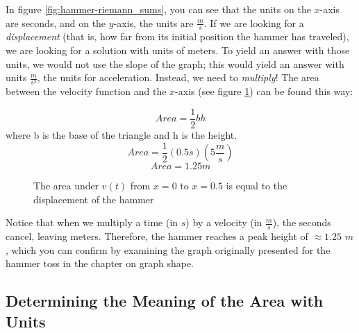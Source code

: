 In figure \ref{fig:hammer-riemann_sums}, you can see that the units on the $x$-axis are seconds, and on the $y$-axis, the units are $\frac{m}{s}$. If we are looking for a \textit{displacement} (that is, how far from its initial position the hammer has traveled), we are looking for a solution with units of meters. To yield an answer with those units, we would not use the slope of the graph; this would yield an answer with units $\frac{m}{s^2}$, the units for acceleration. Instead, we need to \textit{multiply}! The area between the velocity function and the $x$-axis (see figure \ref{fig:hammerarea}) can be found this way:

$$Area=\frac{1}{2}bh$$where b is the base of the triangle and h is the height.
$$Area=\frac{1}{2}(0.5s)(5\frac{m}{s})$$
$$Area=1.25m$$


\begin{figure}[H]
	\centering
	\caption{The area under $v(t)$ from $x=0$ to $x=0.5$ is equal to the displacement of the hammer}
	\label{fig:hammerarea}
\end{figure}

Notice that when we multiply a time (in $s$) by a velocity (in $\frac{m}{s}$), the seconds cancel, leaving meters. Therefore, the hammer reaches a peak height of $\approx1.25$ $m$, which you can confirm by examining the graph originally presented for the hammer toss in the chapter on graph shape.

\subsection{Determining the Meaning of the Area with Units}

